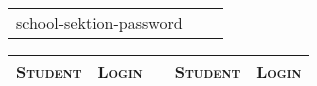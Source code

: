 \documentclass{tufte-handout}
\begin{document}
  \begin{fullwidth}
    \begin{table}
      \begin{tabular}{ccc}
        school-sektion-password
      \end{tabular}
    \end{table}

    \begin{table}
      \begin{tabular}{llcll}
        \toprule
          \textsc{Student} & \textsc{Login} & \hspace{2cm} & \textsc{Student} & \textsc{Login} \\
        \midrule
      \end{tabular}
    \end{table}
  \end{fullwidth}
\end{document}
